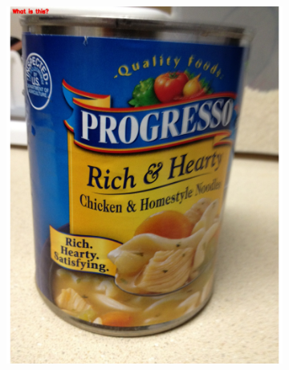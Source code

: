 \documentclass[sigconf]{acmart}
\begin{document}
\begin{figure}[hbp]
        \centering
        \begin{subfigure}[b]{0.4\columnwidth} 
                \includegraphics[scale=0.3]{images/object_1.pdf}  
        \end{subfigure}%
        ~ 
        \begin{subfigure}[b]{0.4\columnwidth}

\end{subfigure}
\end{figure}
\end{document}
